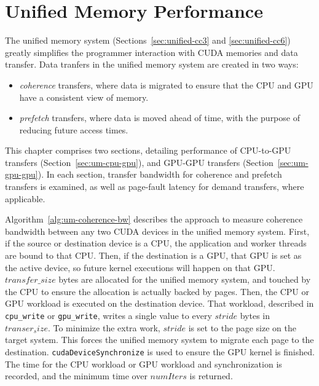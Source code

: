 \chapter{Unified Memory Performance}
\label{ch:unified}

The unified memory system (Sections~\ref{sec:unified-cc3} and \ref{sec:unified-cc6}) greatly simplifies the programmer interaction with CUDA memories and data transfer.
Data tranfers in the unified memory system are created in two ways:
\begin{itemize}
    \item \textit{coherence} transfers, where data is migrated to ensure that the CPU and GPU have a consistent view of memory.
    \item \textit{prefetch} transfers, where data is moved ahead of time, with the purpose of reducing future access times. 
\end{itemize}
This chapter comprises two sections, detailing performance of CPU-to-GPU transfers (Section~\ref{sec:um-cpu-gpu}), and GPU-GPU transfers (Section~\ref{sec:um-gpu-gpu}).
In each section, transfer bandwidth for coherence and prefetch transfers is examined, as well as page-fault latency for demand transfers, where applicable.

Algorithm~\ref{alg:um-coherence-bw} describes the approach to measure coherence bandwidth between any two CUDA devices in the unified memory system.
First, if the source or destination device is a CPU, the application and worker threads are bound to that CPU.
Then, if the destination is a GPU, that GPU is set as the active device, so future kernel executions will happen on that GPU.
$transfer\_size$ bytes are allocated for the unified memory system, and touched by the CPU to ensure the allocation is actually backed by pages.
Then, the CPU or GPU workload is executed on the destination device.
That workload, described in \texttt{cpu\_write} or \texttt{gpu\_write}, writes a single value to every $stride$ bytes in $transer_size$.
To minimize the extra work, $stride$ is set to the page size on the target system.
This forces the unified memory system to migrate each page to the destination.
\texttt{cudaDeviceSynchronize} is used to ensure the GPU kernel is finished.
The time for the CPU workload or GPU workload and synchronization is recorded, and the minimum time over $numIters$ is returned.

